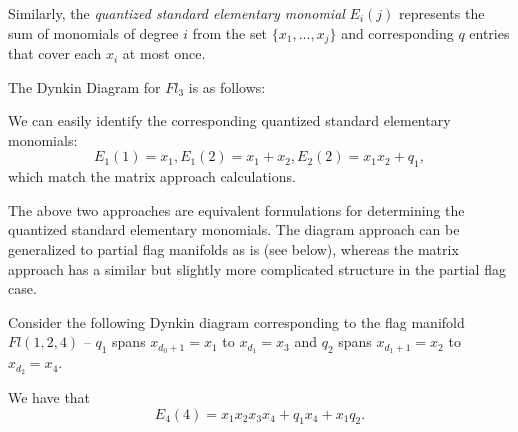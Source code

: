 \documentclass[11pt]{article}
\begin{document}
Similarly, the \textit{quantized standard elementary monomial} $E_i(j)$ represents the sum of monomials of degree $i$ from the set $\{x_1, \dots, x_j\}$ and corresponding $q$ entries that cover each $x_i$ at most once. \\

\begin{eg}
The Dynkin Diagram for $Fl_3$ is as follows:
\begin{center}
\end{center}
We can easily identify the corresponding quantized standard elementary monomials:
\[
    \boxed{E_1(1) = x_1, E_1(2) = x_1 + x_2, E_2(2) = x_1x_2 + q_1},
\]
which match the matrix approach calculations.
\end{eg}


\begin{remark}
The above two approaches are equivalent formulations for determining the quantized standard elementary monomials. The diagram approach can be generalized to partial flag manifolds as is (see below), whereas the matrix approach has a similar but slightly more complicated structure in the partial flag case.
\end{remark}

\begin{eg}
Consider the following Dynkin diagram corresponding to the flag manifold $Fl(1, 2, 4)$ -- $q_1$ spans $x_{d_0 + 1} = x_1$ to $x_{d_1} = x_3$ and $q_2$ spans $x_{d_1 + 1} = x_2$ to $x_{d_2} = x_4$. 
\begin{center}
\end{center}

We have that
\[
    E_4(4) = x_1x_2x_3x_4 + q_1x_4 + x_1q_2.
\]
\end{eg}
\end{document}
